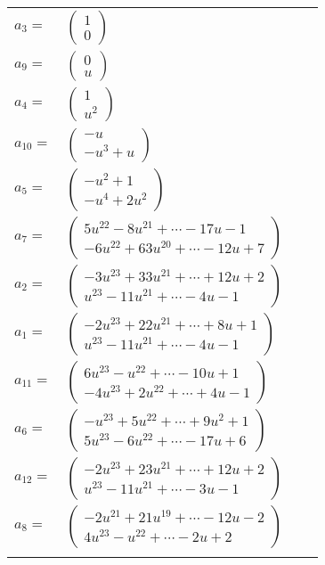 \documentclass[1p]{elsarticle_modified}
\theoremstyle{definition}
\begin{document}
\begin{tabular}{m{7pt} m{180pt} m{7pt} m{180pt} }
\flushright $a_{3}=$&$\begin{pmatrix}1\\0\end{pmatrix}$ \\
\flushright $a_{9}=$&$\begin{pmatrix}0\\u\end{pmatrix}$ \\
\flushright $a_{4}=$&$\begin{pmatrix}1\\u^2\end{pmatrix}$ \\
\flushright $a_{10}=$&$\begin{pmatrix}- u\\- u^3+u\end{pmatrix}$ \\
\flushright $a_{5}=$&$\begin{pmatrix}- u^2+1\\- u^4+2 u^2\end{pmatrix}$ \\
\flushright $a_{7}=$&$\begin{pmatrix}5 u^{22}-8 u^{21}+\cdots-17 u-1\\-6 u^{22}+63 u^{20}+\cdots-12 u+7\end{pmatrix}$ \\
\flushright $a_{2}=$&$\begin{pmatrix}-3 u^{23}+33 u^{21}+\cdots+12 u+2\\u^{23}-11 u^{21}+\cdots-4 u-1\end{pmatrix}$ \\
\flushright $a_{1}=$&$\begin{pmatrix}-2 u^{23}+22 u^{21}+\cdots+8 u+1\\u^{23}-11 u^{21}+\cdots-4 u-1\end{pmatrix}$ \\
\flushright $a_{11}=$&$\begin{pmatrix}6 u^{23}- u^{22}+\cdots-10 u+1\\-4 u^{23}+2 u^{22}+\cdots+4 u-1\end{pmatrix}$ \\
\flushright $a_{6}=$&$\begin{pmatrix}- u^{23}+5 u^{22}+\cdots+9 u^2+1\\5 u^{23}-6 u^{22}+\cdots-17 u+6\end{pmatrix}$ \\
\flushright $a_{12}=$&$\begin{pmatrix}-2 u^{23}+23 u^{21}+\cdots+12 u+2\\u^{23}-11 u^{21}+\cdots-3 u-1\end{pmatrix}$ \\
\flushright $a_{8}=$&$\begin{pmatrix}-2 u^{21}+21 u^{19}+\cdots-12 u-2\\4 u^{23}- u^{22}+\cdots-2 u+2\end{pmatrix}$\\&\end{tabular}
\end{document}
